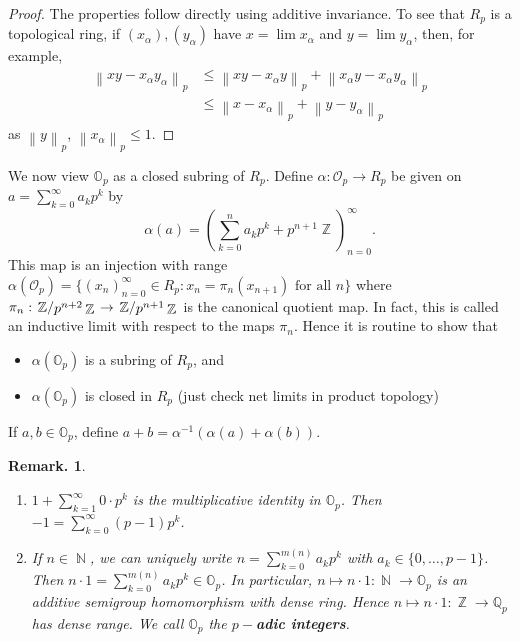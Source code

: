 \documentclass[11pt, a4paper]{memoir}
\DeclareMathOperator{\N}{{\mathbb{N}}}
\DeclareMathOperator{\Z}{{\mathbb{Z}}}
\newcommand{\norm}[1]{\ensuremath{\left\lVert#1\right\rVert}}
\theoremstyle{change}
\theoremstyle{plain}
\theoremstyle{nonumberplain}
\newtheorem{remark}{Remark.}
\newtheorem{proof}{Proof}
\newcommand{\quot}[2]{\mathchoice{\left.\raisebox{0.14em}{$#1$}\middle/\raisebox{-0.14em}{$#2$}\right.}
                                 {\left.\raisebox{0.08em}{$#1$}\middle/\raisebox{-0.08em}{$#2$}\right.}
                                 {\left.\raisebox{0.03em}{$#1$}\middle/\raisebox{-0.03em}{$#2$}\right.}
                                 {\left.\raisebox{0em}{$#1$}\middle/\raisebox{0em}{$#2$}\right.}}
\newcommand{\defn}[1]{{\boldmath\bfseries #1}}
\numberwithin{equation}{section}
\begin{document}
\begin{proof}
    The properties follow directly using additive invariance.
    To see that $R_p$ is a topological ring, if $(x_\alpha),(y_\alpha)$ have $x=\lim x_\alpha$ and $y=\lim y_\alpha$, then, for example,
    \begin{align*}
        \norm{xy-x_\alpha y_\alpha}_p&\leq\norm{xy-x_\alpha y}_p+\norm{x_\alpha y-x_\alpha y_\alpha}_p\\
                                     &\leq\norm{x-x_\alpha}_p+\norm{y-y_\alpha}_p
    \end{align*}
    as $\norm{y}_p$, $\norm{x_\alpha}_p\leq 1$.
\end{proof}
We now view $\mathbb{O}_p$ as a closed subring of $R_p$.
Define $\alpha:\mathcal{O}_p\to R_p$ be given on $a=\sum_{k=0}^\infty a_kp^k$ by
\begin{equation*}
    \alpha(a) = \left(\sum_{k=0}^n a_kp^k+p^{n+1}\Z\right)_{n=0}^\infty.
\end{equation*}
This map is an injection with range $\alpha(\mathcal{O}_p)=\{(x_n)_{n=0}^\infty\in R_p:x_n=\pi_n(x_{n+1})\text{ for all }n\}$ where $\pi_n:\quot{\Z}{p^{n+2}\Z}\to\quot{\Z}{p^{n+1}\Z}$ is the canonical quotient map.
In fact, this is called an inductive limit with respect to the maps $\pi_n$.
Hence it is routine to show that
\begin{itemize}[nl]
    \item $\alpha(\mathbb{O}_p)$ is a subring of $R_p$, and
    \item $\alpha(\mathbb{O}_p)$ is closed in $R_p$ (just check net limits in product topology)
\end{itemize}
If $a,b\in\mathbb{O}_p$, define $a+b=\alpha^{-1}(\alpha(a)+\alpha(b))$.
\begin{remark}
    \begin{enumerate}[nl,r]
        \item $1+\sum_{k=1}^\infty 0\cdot p^k$ is the multiplicative identity in $\mathbb{O}_p$.
            Then $-1=\sum_{k=0}^\infty(p-1)p^k$.
        \item If $n\in\N$, we can uniquely write $n=\sum_{k=0}^{m(n)} a_kp^k$ with $a_k\in\{0,\ldots,p-1\}$.
            Then $n\cdot 1=\sum_{k=0}^{m(n)}a_kp^k\in\mathbb{O}_p$.
            In particular, $n\mapsto n\cdot 1:\N\to\mathbb{O}_p$ is an additive semigroup homomorphism with dense ring.
            Hence $n\mapsto n\cdot 1:\Z\to \mathbb{Q}_p$ has dense range.
            We call $\mathbb{O}_p$ the \defn{$p-$adic integers}.
    \end{enumerate}
\end{remark}
\end{document}

